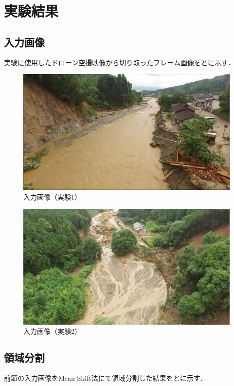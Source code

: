 \documentclass[../Thesis]{subfiles}
\begin{document}
\section{実験結果}
\subsection{入力画像}
実験に使用したドローン空撮映像から切り取ったフレーム画像をとに示す．

\begin{figure}[tbp]
	\centering
	\includegraphics[width=12cm]{img/original1.png}
	\caption{入力画像（実験1）}
	\label{img06}
\end{figure}

\begin{figure}[tbp]
	\centering
	\includegraphics[width=12cm]{img/original2.png}
	\caption{入力画像（実験2）}
	\label{img07}
\end{figure}


\subsection{領域分割}
前節の入力画像をMean-Shift法にて領域分割した結果をとに示す．
\end{document}

